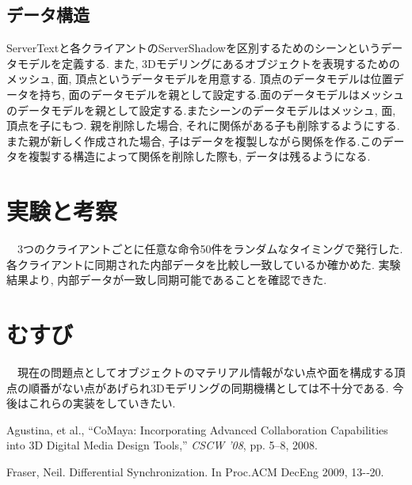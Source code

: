 \documentclass{AIabst}
\begin{document}
  \subsection{データ構造}
  ServerTextと各クライアントのServerShadowを区別するためのシーンというデータモデルを定義する.
  また, 3Dモデリングにあるオブジェクトを表現するためのメッシュ, 面, 頂点というデータモデルを用意する.
  頂点のデータモデルは位置データを持ち, 面のデータモデルを親として設定する.面のデータモデルはメッシュのデータモデルを親として設定する.またシーンのデータモデルはメッシュ, 面, 頂点を子にもつ. 親を削除した場合, それに関係がある子も削除するようにする. また親が新しく作成された場合, 子はデータを複製しながら関係を作る.このデータを複製する構造によって関係を削除した際も, データは残るようになる.
\section{実験と考察}
　3つのクライアントごとに任意な命令50件をランダムなタイミングで発行した.
  各クライアントに同期された内部データを比較し一致しているか確かめた.
  実験結果より, 内部データが一致し同期可能であることを確認できた.
\section{むすび}
　現在の問題点としてオブジェクトのマテリアル情報がない点や面を構成する頂点の順番がない点があげられ3Dモデリングの同期機構としては不十分である.
今後はこれらの実装をしていきたい.

\begin{thebibliography}{9}
	Agustina, et al., ``CoMaya: Incorporating Advanced Collaboration Capabilities into 3D Digital Media Design Tools,'' {\it CSCW '08}, pp. 5--8, 2008.

  Fraser,	Neil.	Differential Synchronization. In Proc.ACM DecEng 2009, 13-­‐20.
\end{thebibliography}
\end{document}
